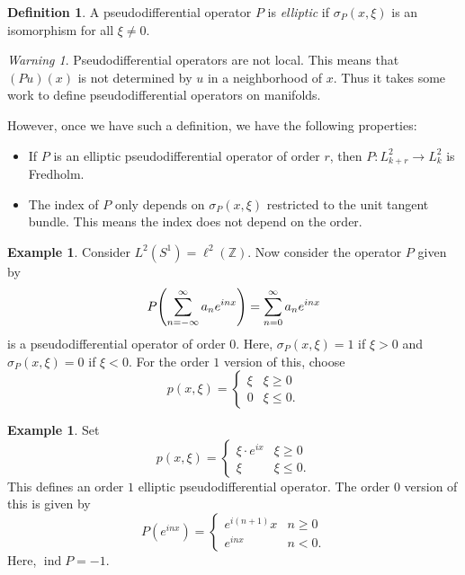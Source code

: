 \documentclass[leqno, openany]{memoir}
\theoremstyle{definition}
\newtheorem{defn}[thm]{Definition}
\newtheorem{exm}[thm]{Example}
\theoremstyle{remark}
\newtheorem{warn}[thm]{Warning}
\theoremstyle{plain}
\theoremstyle{definition}
\theoremstyle{remark}
\newcommand{\Z}{\mathbb{Z}}
\DeclareMathOperator{\ind}{ind}
\begin{document}
\begin{defn}
    A pseudodifferential operator $P$ is \textit{elliptic} if $\sigma_P(x, \xi)$ is an isomorphism for all $\xi \neq 0$.
\end{defn}

\begin{warn}
    Pseudodifferential operators are not local. This means that $(Pu)(x)$ is not determined by $u$ in a neighborhood of $x$. Thus it takes some work to define pseudodifferential operators on manifolds.
\end{warn}

However, once we have such a definition, we have the following properties:
\begin{itemize}
    \item If $P$ is an elliptic pseudodifferential operator of order $r$, then $P \colon L^2_{k+r} \to L^2_k$ is Fredholm.
    \item The index of $P$ only depends on $\sigma_P(x, \xi)$ restricted to the unit tangent bundle. This means the index does not depend on the order.
\end{itemize}

\begin{exm}
    Consider $L^2(S^1) = \ell^2(\Z)$. Now consider the operator $P$ given by
    \[ P\qty(\sum_{n=-\infty}^{\infty} a_n e^{inx}) = \sum_{n=0}^{\infty} a_n e^{inx} \]
    is a pseudodifferential operator of order $0$. Here, $\sigma_P(x, \xi) = 1$ if $\xi > 0$ and $\sigma_P(x, \xi) = 0$ if $\xi < 0$. For the order $1$ version of this, choose 
    \[ p(x, \xi) = \begin{cases}
        \xi & \xi \geq 0 \\
        0 & \xi \leq 0.
    \end{cases} \]
\end{exm}

\begin{exm}
    Set
    \[ p(x, \xi) = \begin{cases}
        \xi \cdot e^{ix} & \xi \geq 0 \\
        \xi & \xi \leq 0.
    \end{cases} \]
    This defines an order $1$ elliptic pseudodifferential operator. The order $0$ version of this is given by
    \[ P(e^{inx}) = \begin{cases}
        e^{i(n+1)} x & n \geq 0 \\
        e^{inx} & n < 0.
    \end{cases} \]
    Here, $\ind P = -1$.
\end{exm}
\end{document}
